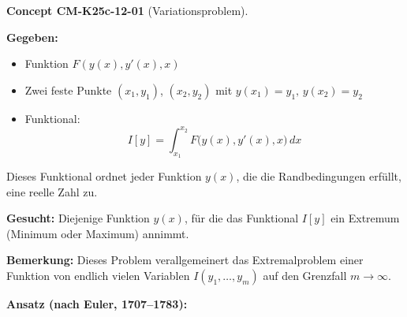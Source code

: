 \documentclass[10pt, letterpaper]{article}
\newcommand{\CustomHeading}[3]{%
  \par\medskip\noindent%
  \textbf{#1 #2} \textnormal{(#3)}.\enskip%
}
\newenvironment{CONC}[2]{\begin{unitbox}\CustomHeading{Concept}{#1}{#2}}{\end{unitbox}}
\begin{document}
\begin{CONC}{CM-K25c-12-01}{Variationsproblem}
\textbf{Gegeben:}
\begin{itemize}
  \item Funktion \( F(y(x), y'(x), x) \)
  \item Zwei feste Punkte \( (x_1, y_1) \), \( (x_2, y_2) \) mit \( y(x_1) = y_1, \, y(x_2) = y_2 \)
  \item Funktional:
  \[
  I[y] = \int_{x_1}^{x_2} F\big(y(x), y'(x), x\big)\, dx
  \]
\end{itemize}

Dieses Funktional ordnet jeder Funktion \( y(x) \), die die Randbedingungen erfüllt, eine reelle Zahl zu.

\vspace{1em}
\textbf{Gesucht:} Diejenige Funktion \( y(x) \), für die das Funktional \( I[y] \) ein Extremum (Minimum oder Maximum) annimmt.

\begin{center}
\end{center}

\textbf{Bemerkung:} Dieses Problem verallgemeinert das Extremalproblem einer Funktion von endlich vielen Variablen \( I(y_1, \dots, y_m) \) auf den Grenzfall \( m \to \infty \).
\end{CONC}

\vspace{1em}


\textbf{Ansatz (nach Euler, 1707–1783):} 
\end{document}
